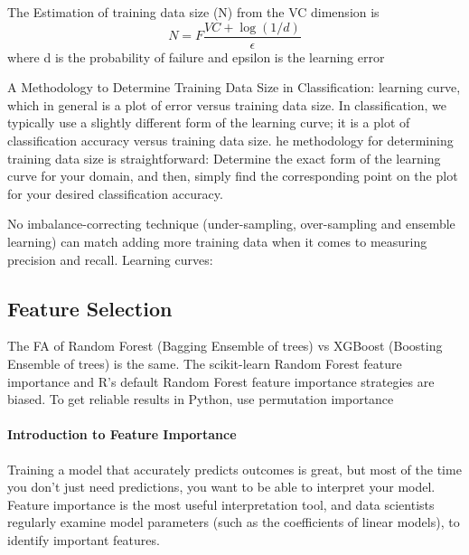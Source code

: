 \documentclass[preprint,12pt]{elsarticle}
\begin{document}
The Estimation of training data size (N) from the VC dimension is
\begin{equation}
N = F\frac{VC + \log(1/d)}{\epsilon}
\end{equation}
where d is the probability of failure and epsilon is the learning error

A Methodology to Determine Training Data Size in Classification:  learning curve, which in general is a plot of error versus training data size. In classification, we typically use a slightly different form of the learning curve; it is a plot of classification accuracy versus training data size. he methodology for determining training data size is straightforward: Determine the exact form of the learning curve for your domain, and then, simply find the corresponding point on the plot for your desired classification accuracy. 

No imbalance-correcting technique (under-sampling, over-sampling and ensemble learning) can match adding more training data when it comes to measuring precision and recall.
Learning curves:




\subsection{Feature Selection}
The FA of Random Forest (Bagging Ensemble of trees) vs XGBoost (Boosting Ensemble of trees) is the same.
The scikit-learn Random Forest feature importance and R's default Random Forest feature importance strategies are biased. To get reliable results in Python, use permutation importance
\paragraph*{Introduction to Feature Importance}
Training a model that accurately predicts outcomes is great, but most of the time you don't just need predictions, you want to be able to interpret your model. Feature importance is the most useful interpretation tool, and data scientists regularly examine model parameters (such as the coefficients of linear models), to identify important features. 
\end{document}
